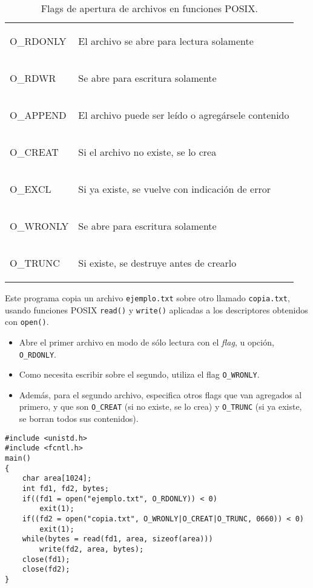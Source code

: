  \begin{table} 
 \centering 
 \small
 \begin{tabular}{l|l}
\begin{codecell}
O_RDONLY
\end{codecell} & El archivo se abre para lectura solamente\\
\begin{codecell}
O_RDWR
\end{codecell}   & Se abre para escritura solamente\\
\begin{codecell}
O_APPEND
\end{codecell} & El archivo puede ser leído o agregársele contenido\\
\begin{codecell}
O_CREAT
\end{codecell}  & Si el archivo no existe, se lo crea\\
\begin{codecell}
O_EXCL
\end{codecell}   & Si ya existe, se vuelve con indicación de error\\
\begin{codecell}
O_WRONLY
\end{codecell} & Se abre para escritura solamente\\
\begin{codecell}
O_TRUNC
\end{codecell}  & Si existe, se destruye antes de crearlo\\

 \end{tabular}
 \caption{Flags de apertura de archivos en funciones POSIX.}
 \label{tab:flags} 
 \end{table} 
 
\begin{ejemplo}
Este programa copia un archivo \lstinline{ejemplo.txt} sobre otro llamado \lstinline{copia.txt}, usando funciones POSIX \lstinline{read()} y \lstinline{write()} aplicadas a los descriptores obtenidos con \lstinline{open()}.
\begin{itemize}
	\item Abre el primer archivo en modo de sólo lectura con el \textit{flag}, u opción, \lstinline{O_RDONLY}.
	\item Como necesita escribir sobre el segundo, utiliza el flag
\lstinline{O_WRONLY}. 
	\item Además, para el segundo archivo, especifica otros flags que van
agregados al primero, y que son \lstinline{O_CREAT} (si no existe, se lo crea) y \lstinline{O_TRUNC} (si
ya existe, se borran todos sus contenidos).
\end{itemize}
\begin{lstlisting}
#include <unistd.h>
#include <fcntl.h>
main()
{
    char area[1024];
    int fd1, fd2, bytes;
    if((fd1 = open("ejemplo.txt", O_RDONLY)) < 0)
        exit(1);
    if((fd2 = open("copia.txt", O_WRONLY|O_CREAT|O_TRUNC, 0660)) < 0)
        exit(1);
    while(bytes = read(fd1, area, sizeof(area)))
        write(fd2, area, bytes);
    close(fd1);
    close(fd2);
}
\end{lstlisting}
\end{ejemplo}


